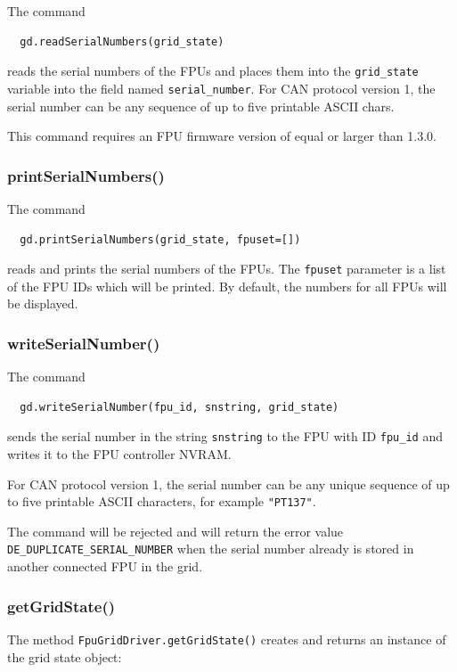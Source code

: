 \documentclass[11pt,a4paper]{scrartcl}
\begin{document}
The command
\begin{verbatim}
  gd.readSerialNumbers(grid_state)
\end{verbatim}
reads the serial numbers of the FPUs and places them into the
\texttt{grid\_state} variable into the field named
\texttt{serial\_number}. For CAN protocol version 1, the serial number
can be any sequence of up to five printable ASCII chars.

This command requires an FPU firmware version of equal or larger than
1.3.0.

\subsubsection{printSerialNumbers()}

The command
\begin{verbatim}
  gd.printSerialNumbers(grid_state, fpuset=[])
\end{verbatim}
reads and prints the serial numbers of the FPUs.  The \texttt{fpuset}
parameter is a list of the FPU IDs which will be printed. By default,
the numbers for all FPUs will be displayed.


\subsubsection{writeSerialNumber()}

The command
\begin{verbatim}
  gd.writeSerialNumber(fpu_id, snstring, grid_state)
\end{verbatim}
sends the serial number in the string \texttt{snstring}
to the FPU with ID \texttt{fpu\_id} and writes it
to the FPU controller NVRAM.

For CAN protocol version 1, the serial number can be any unique
sequence of up to five printable ASCII characters, for example
\texttt{"PT137"}.

\begin{sloppypar}
 The command will be rejected and
will return the error value \texttt{DE\_DUPLICATE\_SERIAL\_NUMBER}
when the serial number already is stored in another connected FPU in
the grid.
\end{sloppypar}



\subsubsection{getGridState()}
The method \texttt{FpuGridDriver.getGridState()} creates and returns
an instance of the grid state object:
\end{document}
